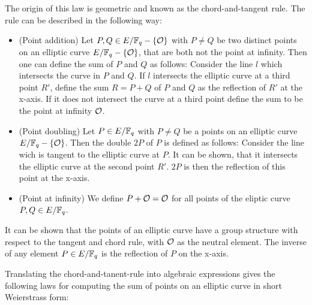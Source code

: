 The origin of this law is geometric and known as the chord-and-tangent rule. The  rule can be described in the following way:
\begin{itemize}
\item (Point addition) Let $P, Q\in E/\mathbb{F}_q- \{\mathcal{O}\}$ with $P\neq Q$ be two distinct points on an elliptic curve $E/\mathbb{F}_q - \{\mathcal{O}\}$, that are both not the point at infinity. Then one can define the sum of $P$ and $Q$ as follows: Consider the line $l$ which intersects the curve in $P$ and $Q$. If $l$ intersects the elliptic curve at a third point $R'$, define the sum $R=P+Q$ of $P$ and $Q$ as the reflection of $R'$ at the x-axis. If it does not intersect the curve at a third point define the sum to be the point at infinity $\mathcal{O}$.
\item (Point doubling) Let $P \in E/\mathbb{F}_q$ with $P\neq Q$ be a points on an elliptic curve $E/\mathbb{F}_q - \{\mathcal{O}\}$. Then the double $2P$ of $P$ is defined as follows: Consider the line wich is tangent to the elliptic curve at $P$. It can be shown, that it intersects the elliptic curve at the second point $R'$. $2P$ is then the reflection of this point at the x-axis.
\item (Point at infinity) We define $P+\mathcal{O} = \mathcal{O}$ for all points of the eliptic curve $P, Q\in E/\mathbb{F}_q$.
\end{itemize}
It can be shown that the points of an elliptic curve have a group structure with respect to the tangent and chord rule, with $\mathcal{O}$ as the neutral element. The inverse of any element $P\in E/\mathbb{F}_q$ is the reflection of $P$ on the x-axis.

Translating the chord-and-tanent-rule into algebraic expressions gives the following laws for computing the sum of points on an elliptic curve in short Weierstrass form:

